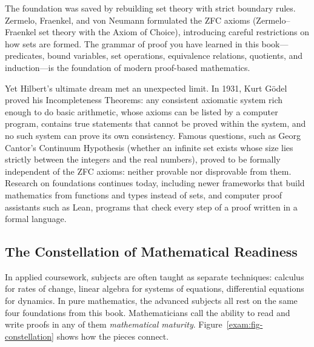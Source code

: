 \begin{historybox}
The foundation was saved by rebuilding set theory with strict boundary rules. Zermelo, Fraenkel, and von Neumann formulated the ZFC axioms (Zermelo--Fraenkel set theory with the Axiom of Choice), introducing careful restrictions on how sets are formed. The grammar of proof you have learned in this book---predicates, bound variables, set operations, equivalence relations, quotients, and induction---is the foundation of modern proof-based mathematics. 

Yet Hilbert's ultimate dream met an unexpected limit. In 1931, Kurt G\"odel proved his Incompleteness Theorems: any consistent axiomatic system rich enough to do basic arithmetic, whose axioms can be listed by a computer program, contains true statements that cannot be proved within the system, and no such system can prove its own consistency. Famous questions, such as Georg Cantor's Continuum Hypothesis (whether an infinite set exists whose size lies strictly between the integers and the real numbers), proved to be formally independent of the ZFC axioms: neither provable nor disprovable from them. Research on foundations continues today, including newer frameworks that build mathematics from functions and types instead of sets, and computer proof assistants such as Lean, programs that check every step of a proof written in a formal language.
\end{historybox}

\subsection{The Constellation of Mathematical Readiness}

In applied coursework, subjects are often taught as separate techniques: calculus for rates of change, linear algebra for systems of equations, differential equations for dynamics. In pure mathematics, the advanced subjects all rest on the same four foundations from this book. Mathematicians call the ability to read and write proofs in any of them \emph{mathematical maturity}. Figure~\ref{exam:fig-constellation} shows how the pieces connect.

